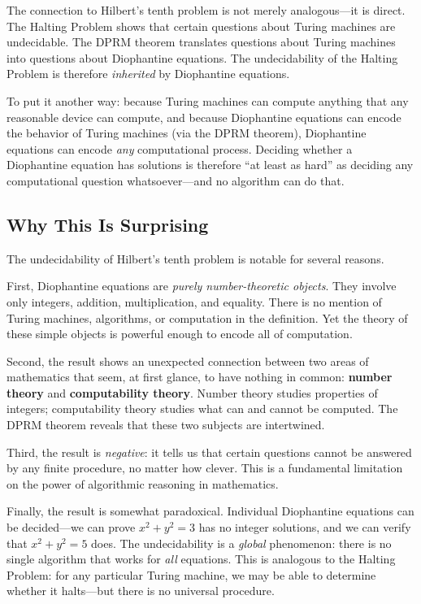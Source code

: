 The connection to Hilbert's tenth problem is not merely analogous---it is direct. The Halting Problem shows that certain questions about Turing machines are undecidable. The DPRM theorem translates questions about Turing machines into questions about Diophantine equations. The undecidability of the Halting Problem is therefore \emph{inherited} by Diophantine equations.

To put it another way: because Turing machines can compute anything that any reasonable device can compute, and because Diophantine equations can encode the behavior of Turing machines (via the DPRM theorem), Diophantine equations can encode \emph{any} computational process. Deciding whether a Diophantine equation has solutions is therefore ``at least as hard'' as deciding any computational question whatsoever---and no algorithm can do that.

\subsection{Why This Is Surprising}

The undecidability of Hilbert's tenth problem is notable for several reasons.

First, Diophantine equations are \emph{purely number-theoretic objects}. They involve only integers, addition, multiplication, and equality. There is no mention of Turing machines, algorithms, or computation in the definition. Yet the theory of these simple objects is powerful enough to encode all of computation.

Second, the result shows an unexpected connection between two areas of mathematics that seem, at first glance, to have nothing in common: \textbf{number theory} and \textbf{computability theory}. Number theory studies properties of integers; computability theory studies what can and cannot be computed. The DPRM theorem reveals that these two subjects are intertwined.

Third, the result is \emph{negative}: it tells us that certain questions cannot be answered by any finite procedure, no matter how clever. This is a fundamental limitation on the power of algorithmic reasoning in mathematics.

Finally, the result is somewhat paradoxical. Individual Diophantine equations can be decided---we can prove $x^2 + y^2 = 3$ has no integer solutions, and we can verify that $x^2 + y^2 = 5$ does. The undecidability is a \emph{global} phenomenon: there is no single algorithm that works for \emph{all} equations. This is analogous to the Halting Problem: for any particular Turing machine, we may be able to determine whether it halts---but there is no universal procedure.

